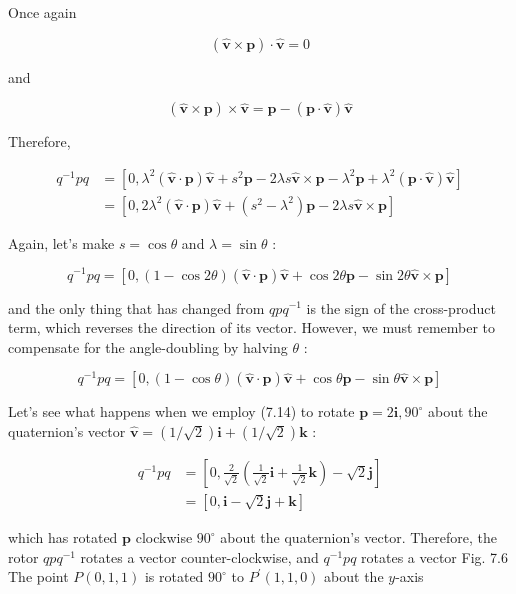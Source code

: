 Once again

$$
(\hat{\mathbf{v}} \times \mathbf{p}) \cdot \hat{\mathbf{v}}=0
$$

and

$$
(\hat{\mathbf{v}} \times \mathbf{p}) \times \hat{\mathbf{v}}=\mathbf{p}-(\mathbf{p} \cdot \hat{\mathbf{v}}) \hat{\mathbf{v}}
$$

Therefore,

$$
\begin{aligned}
q^{-1} p q & =\left[0, \lambda^{2}(\hat{\mathbf{v}} \cdot \mathbf{p}) \hat{\mathbf{v}}+s^{2} \mathbf{p}-2 \lambda s \hat{\mathbf{v}} \times \mathbf{p}-\lambda^{2} \mathbf{p}+\lambda^{2}(\mathbf{p} \cdot \hat{\mathbf{v}}) \hat{\mathbf{v}}\right] \\
& =\left[0,2 \lambda^{2}(\hat{\mathbf{v}} \cdot \mathbf{p}) \hat{\mathbf{v}}+\left(s^{2}-\lambda^{2}\right) \mathbf{p}-2 \lambda s \hat{\mathbf{v}} \times \mathbf{p}\right]
\end{aligned}
$$

Again, let's make $s=\cos \theta$ and $\lambda=\sin \theta$ :

$$
q^{-1} p q=[0,(1-\cos 2 \theta)(\hat{\mathbf{v}} \cdot \mathbf{p}) \hat{\mathbf{v}}+\cos 2 \theta \mathbf{p}-\sin 2 \theta \hat{\mathbf{v}} \times \mathbf{p}]
$$

and the only thing that has changed from $q p q^{-1}$ is the sign of the cross-product term, which reverses the direction of its vector. However, we must remember to compensate for the angle-doubling by halving $\theta$ :

$$
q^{-1} p q=[0,(1-\cos \theta)(\hat{\mathbf{v}} \cdot \mathbf{p}) \hat{\mathbf{v}}+\cos \theta \mathbf{p}-\sin \theta \hat{\mathbf{v}} \times \mathbf{p}]
$$

Let's see what happens when we employ (7.14) to rotate $\mathbf{p}=2 \mathbf{i}, 90^{\circ}$ about the quaternion's vector $\hat{\mathbf{v}}=(1 / \sqrt{2}) \mathbf{i}+(1 / \sqrt{2}) \mathbf{k}$ :

$$
\begin{aligned}
q^{-1} p q & =\left[0, \frac{2}{\sqrt{2}}\left(\frac{1}{\sqrt{2}} \mathbf{i}+\frac{1}{\sqrt{2}} \mathbf{k}\right)-\sqrt{2} \mathbf{j}\right] \\
& =[0, \mathbf{i}-\sqrt{2} \mathbf{j}+\mathbf{k}]
\end{aligned}
$$

which has rotated $\mathbf{p}$ clockwise $90^{\circ}$ about the quaternion's vector. Therefore, the rotor $q p q^{-1}$ rotates a vector counter-clockwise, and $q^{-1} p q$ rotates a vector Fig. 7.6 The point $P(0,1,1)$ is rotated $90^{\circ}$ to $P^{\prime}(1,1,0)$ about the $y$-axis

